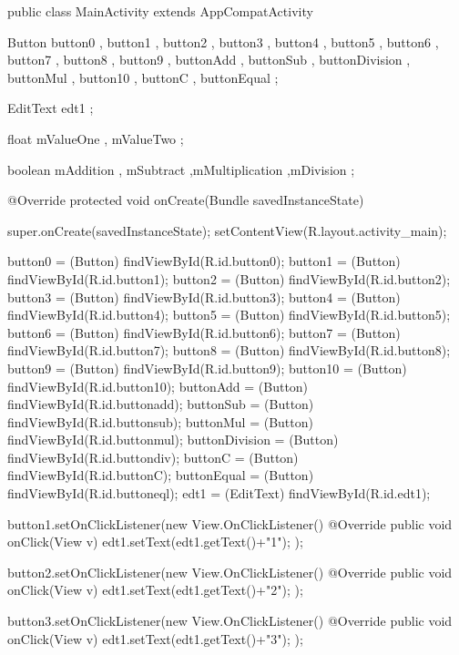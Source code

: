 \documentclass{fisatproject}
\begin{document}
public class MainActivity extends AppCompatActivity {
 
    Button button0 , button1 , button2 , button3 , button4 , button5 , button6 ,
            button7 , button8 , button9 , buttonAdd , buttonSub , buttonDivision ,
            buttonMul , button10 , buttonC , buttonEqual ;
 
    EditText edt1 ;
 
    float mValueOne , mValueTwo ;
 
    boolean mAddition , mSubtract ,mMultiplication ,mDivision ;
 
    @Override
    protected void onCreate(Bundle savedInstanceState) {
        super.onCreate(savedInstanceState);
        setContentView(R.layout.activity_main);
 
        button0 = (Button) findViewById(R.id.button0);
        button1 = (Button) findViewById(R.id.button1);
        button2 = (Button) findViewById(R.id.button2);
        button3 = (Button) findViewById(R.id.button3);
        button4 = (Button) findViewById(R.id.button4);
        button5 = (Button) findViewById(R.id.button5);
        button6 = (Button) findViewById(R.id.button6);
        button7 = (Button) findViewById(R.id.button7);
        button8 = (Button) findViewById(R.id.button8);
        button9 = (Button) findViewById(R.id.button9);
        button10 = (Button) findViewById(R.id.button10);
        buttonAdd = (Button) findViewById(R.id.buttonadd);
        buttonSub = (Button) findViewById(R.id.buttonsub);
        buttonMul = (Button) findViewById(R.id.buttonmul);
        buttonDivision = (Button) findViewById(R.id.buttondiv);
        buttonC = (Button) findViewById(R.id.buttonC);
        buttonEqual = (Button) findViewById(R.id.buttoneql);
        edt1 = (EditText) findViewById(R.id.edt1);
 
 
        button1.setOnClickListener(new View.OnClickListener() {
            @Override
            public void onClick(View v) {
                edt1.setText(edt1.getText()+"1");
            }
        });
 
        button2.setOnClickListener(new View.OnClickListener() {
            @Override
            public void onClick(View v) {
                edt1.setText(edt1.getText()+"2");
            }
        });
 
        button3.setOnClickListener(new View.OnClickListener() {
            @Override
            public void onClick(View v) {
                edt1.setText(edt1.getText()+"3");
            }
        });
 
}}
\end{document}
